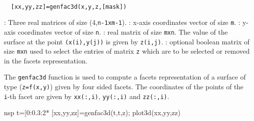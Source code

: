 
\begin{mandesc}
  \\ %
\end{mandesc}
\begin{calling_sequence}
\begin{verbatim}
  [xx,yy,zz]=genfac3d(x,y,z,[mask])
\end{verbatim}
\end{calling_sequence}

\begin{parameters}
  \begin{varlist}
    : Three real matrices of size (4,\verb!n-1xm-1!).
    : x-axis coordinates vector of size \verb!m!.
    : y-axis coordinates vector of size \verb!n!.
    : real matrix of size \verb!mxn!. The value of the surface at the point
    \verb!(x(i),y(j))! is given by \verb!z(i,j)!.
    : optional boolean matrix of size \verb!mxn! used to select the entries
    of matrix \verb!z! which are to be selected or removed in the facets representation.
  \end{varlist}
\end{parameters}

\begin{mandescription}
  The \verb!genfac3d! function is used to compute a facets representation of a surface of type
  (\verb!z=f(x,y)!)  given by four sided facets. The coordinates of the points of the \verb!i!-th facet are
  given by \verb!xx(:,i)!, \verb!yy(:,i)! and \verb!zz(:,i)!.
\end{mandescription}

\begin{examples}
  \begin{mintednsp}{nsp}
    t=[0:0.3:2*%
    [xx,yy,zz]=genfac3d(t,t,z);
    plot3d(xx,yy,zz)
  \end{mintednsp}
\end{examples}
\begin{manseealso}
   
\end{manseealso}
